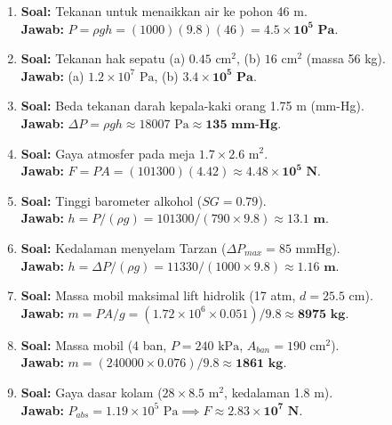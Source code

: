 \documentclass{article}
\begin{document}
\begin{enumerate}[label=\textbf{\arabic*.}]
    \item \textbf{Soal:} Tekanan untuk menaikkan air ke pohon 46 m. \\
    \textbf{Jawab:} $P = \rho gh = (1000)(9.8)(46) = \mathbf{4.5 \times 10^5 \text{ Pa}}$.

    \item \textbf{Soal:} Tekanan hak sepatu (a) $0.45 \text{ cm}^2$, (b) $16 \text{ cm}^2$ (massa 56 kg). \\
    \textbf{Jawab:} (a) $1.2 \times 10^7 \text{ Pa}$, (b) $\mathbf{3.4 \times 10^5 \text{ Pa}}$.

    \item \textbf{Soal:} Beda tekanan darah kepala-kaki orang 1.75 m (mm-Hg). \\
    \textbf{Jawab:} $\Delta P = \rho gh \approx 18007 \text{ Pa} \approx \mathbf{135 \text{ mm-Hg}}$.

    \item \textbf{Soal:} Gaya atmosfer pada meja $1.7 \times 2.6 \text{ m}^2$. \\
    \textbf{Jawab:} $F = P A = (101300)(4.42) \approx \mathbf{4.48 \times 10^5 \text{ N}}$.

    \item \textbf{Soal:} Tinggi barometer alkohol ($SG = 0.79$). \\
    \textbf{Jawab:} $h = P/(\rho g) = 101300/(790 \times 9.8) \approx \mathbf{13.1 \text{ m}}$.

    \item \textbf{Soal:} Kedalaman menyelam Tarzan ($\Delta P_{max} = 85 \text{ mmHg}$). \\
    \textbf{Jawab:} $h = \Delta P/(\rho g) = 11330/(1000 \times 9.8) \approx \mathbf{1.16 \text{ m}}$.

    \item \textbf{Soal:} Massa mobil maksimal lift hidrolik (17 atm, $d = 25.5 \text{ cm}$). \\
    \textbf{Jawab:} $m = PA/g = (1.72 \times 10^6 \times 0.051)/9.8 \approx \mathbf{8975 \text{ kg}}$.

    \item \textbf{Soal:} Massa mobil (4 ban, $P = 240 \text{ kPa}$, $A_{ban} = 190 \text{ cm}^2$). \\
    \textbf{Jawab:} $m = (240000 \times 0.076)/9.8 \approx \mathbf{1861 \text{ kg}}$.

    \item \textbf{Soal:} Gaya dasar kolam ($28 \times 8.5 \text{ m}^2$, kedalaman 1.8 m). \\
    \textbf{Jawab:} $P_{abs} = 1.19 \times 10^5 \text{ Pa} \implies F \approx \mathbf{2.83 \times 10^7 \text{ N}}$.


\end{enumerate}
\end{document}
